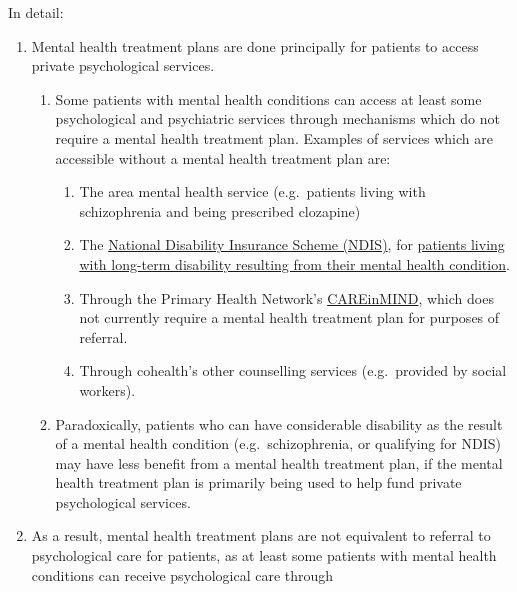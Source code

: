 \documentclass[
  letterpaper,
  DIV=11,
  numbers=noendperiod,
  oneside]{scrartcl}
\providecommand{\tightlist}{%
  \setlength{\itemsep}{0pt}\setlength{\parskip}{0pt}}\usepackage{longtable,booktabs,array}
\begin{document}
In detail:

\begin{enumerate}
\def\labelenumi{\arabic{enumi}.}
\item
  Mental health treatment plans are done principally for patients to
  access private psychological services.

  \begin{enumerate}
  \def\labelenumii{\roman{enumii})}
  \tightlist
  \item
    Some patients with mental health conditions can access at least some
    psychological and psychiatric services through mechanisms which do
    not require a mental health treatment plan. Examples of services
    which are accessible without a mental health treatment plan are:

    \begin{enumerate}
    \def\labelenumiii{\alph{enumiii}.}
    \tightlist
    \item
      The area mental health service (e.g.~patients living with
      schizophrenia and being prescribed clozapine)
    \item
      The \href{https://www.ndis.gov.au/}{National Disability Insurance
      Scheme (NDIS)}, for
      \href{https://www.ndis.gov.au/media/112/download}{patients living
      with long-term disability resulting from their mental health
      condition}.
    \item
      Through the Primary Health Network's
      \href{https://nwmphn.org.au/our-work/mental-health/careinmind-mental-health-services/}{CAREinMIND},
      which does not currently require a mental health treatment plan
      for purposes of referral.
    \item
      Through cohealth's other counselling services (e.g.~provided by
      social workers).
    \end{enumerate}
  \item
    Paradoxically, patients who can have considerable disability as the
    result of a mental health condition (e.g.~schizophrenia, or
    qualifying for NDIS) may have less benefit from a mental health
    treatment plan, if the mental health treatment plan is primarily
    being used to help fund private psychological services.
  \end{enumerate}
\item
  As a result, mental health treatment plans are not equivalent to
  referral to psychological care for patients, as at least some patients
  with mental health conditions can receive psychological care through

\end{enumerate}
\end{document}
